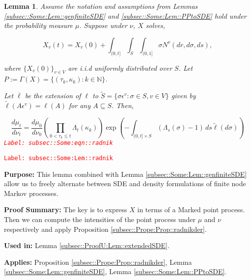 \documentclass[12pt]{article}
\newcommand{\mb}{\mathbb}
\newcommand{\ov}{\overline}
\newcommand{\ep}{\epsilon}
\newcommand{\tr}{\textcolor{red}}
\newcommand{\labe}[1]{\tr{\texttt{Label: #1}}}
\newcommand{\purpose}{\textbf{Purpose: }}
\newcommand{\pfsum}{\textbf{Proof Summary: }}
\newcommand{\usein}{\textbf{Used in: }}
\newcommand{\app}{\textbf{Applies: }}
\newcommand{\ind}{\hspace{24pt}}
\newcommand{\defeq}{:=}								%
\renewcommand{\v}{v}							%
\renewcommand{\S}{S}							%
\newcommand{\s}{\sigma}							%
\newcommand{\ev}{\ep}							%
\renewcommand{\t}{t}							%
\renewcommand{\tt}{s}							%
\newcommand{\X}{X}								%
\newcommand{\vind}[1]{^{#1}}					%
\newcommand{\cind}[1]{_{#1}}					%
\newcommand{\tp}[1]{(#1)}						%
\newcommand{\ts}[1]{_{#1}}						%
\newcommand{\poiss}{N}							%
\newcommand{\Sm}{\ell}							%
\renewcommand{\r}{r}							%
\newcommand{\alt}[1]{\widetilde{#1}}			%
\newcommand{\indx}[1]{_{#1}}					%
\newcommand{\m}{\mu}							%
\newcommand{\mm}{\nu}							%
\newcommand{\rt}{\tau}							%
\renewcommand{\it}{k}							%
\newcommand{\pmap}{\Gamma}						%
\renewcommand{\mark}{\kappa}					%
\newcommand{\rp}{P}								%
\newcommand{\typset}{A}							%
\newcommand{\ratee}{\Lambda}					%
\newtheorem{lem}[thms]{Lemma}
\begin{document}
\begin{lem}
Assume the notation and assumptions from Lemmas \ref{subsec::Some:Lem::genfiniteSDE} and \ref{subsec::Some:Lem::PPtoSDE} hold under the probability measure \(\m\). Suppose under \(\mm\), \(\X\) solves,

\[\X\cind{\v}\tp{\t} = \X\cind{\v}\tp{0} +\int_{(0,\t]}\int_\S\int_{(0,1]} \s \poiss\vind{\v}(d\r,d\s,d\tt),\]

where \(\{\X\cind{\v}\tp{0}\}_{\v \in V}\) are i.i.d uniformly distributed over \(\S\). Let \(\rp \defeq \pmap(\X) = \{(\rt\indx{\it},\mark\indx{\it}):\it\in \mb{N}\}\).

\ind Let \(\ov{\ell}\) be the extension of \(\Sm\) to \(\alt{\S} = \{\s\ev\vind{\v}: \s \in \S, \v \in V\}\) given by \(\alt{\Sm}(\typset\ev\vind{\v}) = \Sm(\typset)\) for any \(\typset \subseteq \S\). Then,

\begin{equation}
\frac{d\m\ts{\t}}{d\mm\ts{\t}}= \frac{d\m\ts{0}}{d\mm\ts{0}}\left(\prod_{0< \rt\indx{\it}\leq \t} \ratee\ts{\t}(\mark\indx{\it})\right)\exp\left(-\int_{(0,\t]\times \S} (\ratee\ts{\tt}(\s) - 1)\,d\tt\alt{\Sm}(d\s)\right)
\label{subsec::Some:eqn::radnik}
\end{equation}
\labe{subsec::Some:eqn::radnik}
\label{subsec::Some:Lem::radnik}
\end{lem}
\labe{subsec::Some:Lem::radnik}

\purpose This lemma combined with Lemma \ref{subsec::Some:Lem::genfiniteSDE} allow us to freely alternate between SDE and density formulations of finite node Markov processes.

\pfsum The key is to express \(\X\) in terms of a Marked point process. Then we can compute the intensities of the point process under \(\m\) and \(\mm\) respectively and apply Proposition \ref{subsec::Prope:Prop::radnikder}.

\usein Lemma \ref{subsec::ProofU:Lem::extendedSDE}.

\app Proposition \ref{subsec::Prope:Prop::radnikder}, Lemma \ref{subsec::Some:Lem::genfiniteSDE}, Lemma \ref{subsec::Some:Lem::PPtoSDE}.
\end{document}

